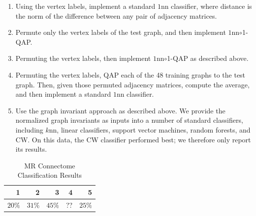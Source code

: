 \begin{enumerate}
	\item Using the vertex labels, implement a standard $1$nn classifier, where distance is the norm of the difference between any pair of adjacency matrices.
	\item Permute only the vertex labels of the test graph, and then implement $1$nn$\circ$1-QAP.
	\item Permuting the vertex labels, then implement $1$nn$\circ$1-QAP as described above.
	\item Permuting the vertex labels, QAP each of the 48 training graphs to the test graph.  Then, given those permuted adjacency matrices, compute the average, and then implement a standard $1$nn classifier.
	\item Use the graph invariant approach as described above. We provide the normalized graph invariants as inputs into a number of standard classifiers, including $k$nn, linear classifiers, support vector machines, random forests, and CW. On this data, the CW classifier performed best; we therefore only report its results.
\end{enumerate}


\begin{table}[h!]
\caption{MR Connectome Classification Results}
\begin{center}
\begin{tabular}{|r|r|r|r|r|}
\hline
1 & 2  & 3 & 4 & 5\\
\hline
$20\%$ & $31\%$ & $45\%$ & ?? & $25\%$ \\
    \hline
\end{tabular}
\end{center}
\label{tab:fwpath}
\end{table}%



